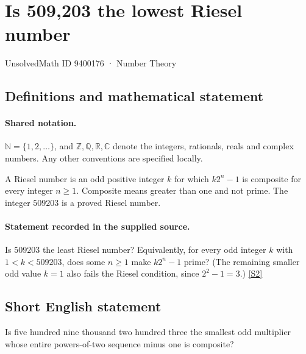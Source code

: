 \documentclass[11pt]{article}
\newcommand{\sref}[2]{\hyperlink{source:#1:#2}{[S#2]}}
\begin{document}
\setcounter{section}{9400175}
\section{Is 509,203 the lowest Riesel number}\label{9400176}
{\small\sffamily UnsolvedMath ID 9400176 · Number Theory}
\subsection{Definitions and mathematical statement}

\paragraph{Shared notation.}$\mathbb N=\{1,2,\ldots\}$, and $\mathbb Z,\mathbb Q,\mathbb R,\mathbb C$ denote the integers, rationals, reals and complex numbers. Any other conventions are specified locally.


A Riesel number is an odd positive integer $k$ for which $k2^n-1$ is composite for every integer $n\ge1$. Composite means greater than one and not prime. The integer $509203$ is a proved Riesel number.
\paragraph{Statement recorded in the supplied source.}
Is $509203$ the least Riesel number? Equivalently, for every odd integer $k$ with $1<k<509203$, does some $n\ge1$ make $k2^n-1$ prime? (The remaining smaller odd value $k=1$ also fails the Riesel condition, since $2^2-1=3$.) \sref{9400176}{2}
\subsection{Short English statement}
Is five hundred nine thousand two hundred three the smallest odd multiplier whose entire powers-of-two sequence minus one is composite?
\end{document}
